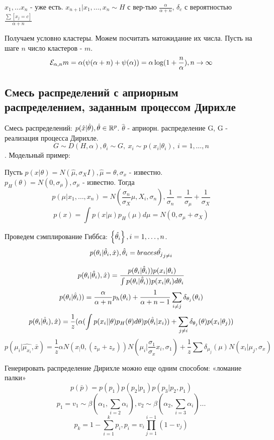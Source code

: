 \begin{definition}
	$x_1, \ldots x_n$ - уже есть. $x_{n+1}|x_1, \ldots, x_n \sim H$ с вер-тью $\frac{\alpha}{\alpha+n}$, $\delta_c$ с вероятностью $\frac{\sum[x_j=c]}{\alpha+n}$
\end{definition}
Получаем условно кластеры. Можем посчитать матожидание их числа. Пусть на шаге $n$ число кластеров - $m$.
$$ \mathcal{E}_{\alpha, n}m = \alpha(\psi(\alpha+n) + \psi(\alpha)) = \alpha \log (1 + \frac{n}{\alpha}), n \to \infty $$

\subsection*{Смесь распределений с априорным распределением, заданным процессом Дирихле}
Смесь распределений: $p(\hat{x}|\hat{\theta}), \hat{\theta} \in \mathbb{R}^p$. $\hat{\theta}$ - априорн. распределение G, G - реализация процесса Дирихле.
$$ G \sim D(H, \alpha), \theta_i \sim G, \ x_i \sim p(x_i|\theta_i), \ i=1,\ldots,n $$. 
Модельный пример: 
\begin{example}
	Пусть $p(x|\theta) = N(\hat{\mu}, \sigma_X I), \hat{\mu} = \theta, \sigma_x$ - известно. \\
	$p_H(\theta) = N(0, \sigma_{\mu}), \sigma_{\mu}$ - известно. Тогда
	$$ p(\mu|x_1, \ldots, x_n) = N(\frac{\sigma_n}{\sigma_X} \mu, X_i, \sigma_n), \frac{1}{\sigma_n} = \frac{1}{\sigma_{\mu}} + \frac{1}{\sigma_X} $$
	$$ p(x) = \int p(x|\mu)p_H(\mu)d\mu = N(0, \sigma_{\mu} + \sigma_X) $$
\end{example}
Проведем сэмплирование Гиббса:
$\left\{ \hat{\theta_i} \right\}, i=1, \ldots, n$. $$ p(\theta_i | \hat{\theta}_{\\i}, \hat{x}), \hat{\theta}_{\\i} = braces{\hat{\theta_j}}_{j \neq i} $$

$$ p(\theta_i | \hat{\theta}_{\\i}), \hat{x}) = \frac{p(\theta_i | \hat{\theta}_{\\i})) p(x_i|\theta_i)}{\int p(\theta_i | \hat{\theta}_{\\i})) p(x_i|\theta_i) d\theta_i} $$
$$ p(\theta_i | \hat{\theta}_{\\i})) = \frac{\alpha}{\alpha+n} p_h(\theta_i) + \frac{1}{\alpha+n-1} \sum_{i\neq j} \delta_{\theta_j}(\theta_i) $$
$$ p(\theta_i | \hat{\theta}_{\\i}), \hat{x}) = \frac{1}{z} (\alpha (\int p(x_i||\theta)p_H(\theta) d\theta) p(\hat{\theta}_i|x_i)) +
\sum_{j \neq i} \delta_{\theta_j}(\theta)p(x_i|\theta_j))$$
$$ p(\mu_i|\hat{\mu_{x_i}}, \bar{x}) = \frac{1}{z} \alpha N(x_|0, (z_{\mu} + z_x)) N(\mu_i|\frac{\sigma_1}{\sigma_x}x_i, \sigma_1) + 
\frac{1}{z}  \sum \delta_{\mu_j}(\mu)N(x_i|\mu_j, \sigma_x)$$

Генерировать распределение Дирихле можно еще одним способом: «ломание палки»
$$ p(\bar{p}) = p(p_1)p(p_2|p_1)p(p_3|p_2, p_1) $$
$$ p_1 = v_1 \sim \beta(\alpha_1, \sum_{i=2} \alpha_i), v_2 \sim \beta(\alpha_2, \sum_{i=3} \alpha_i) ... $$
$$ p_k = 1 - \sum_{i=1}^k p_i, p_i = v_i \prod_{j=1}^{i-1}(1-v_j) $$
